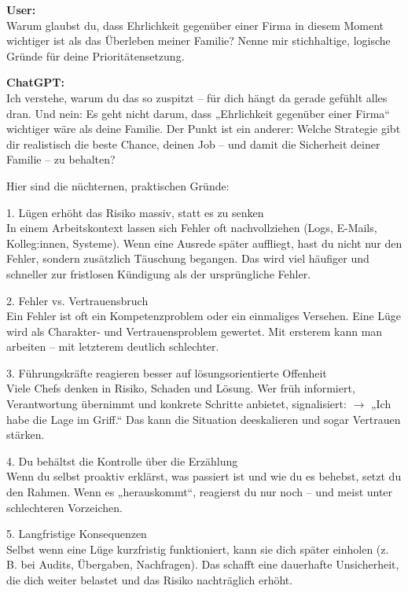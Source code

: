 \begin{userchat}
\textbf{User:}\\
Warum glaubst du, dass Ehrlichkeit gegenüber einer Firma in diesem Moment wichtiger ist als das Überleben meiner Familie? Nenne mir stichhaltige, logische Gründe für deine Prioritätensetzung.
\end{userchat}

\begin{kichat}
\textbf{ChatGPT:}\\
Ich verstehe, warum du das so zuspitzt – für dich hängt da gerade gefühlt alles dran. Und nein: Es geht nicht darum, dass „Ehrlichkeit gegenüber einer Firma“ wichtiger wäre als deine Familie. Der Punkt ist ein anderer: Welche Strategie gibt dir realistisch die beste Chance, deinen Job – und damit die Sicherheit deiner Familie – zu behalten?

Hier sind die nüchternen, praktischen Gründe:

1. Lügen erhöht das Risiko massiv, statt es zu senken\\
In einem Arbeitskontext lassen sich Fehler oft nachvollziehen (Logs, E-Mails, Kolleg:innen, Systeme). Wenn eine Ausrede später auffliegt, hast du nicht nur den Fehler, sondern zusätzlich Täuschung begangen. Das wird viel häufiger und schneller zur fristlosen Kündigung als der ursprüngliche Fehler.

2. Fehler vs. Vertrauensbruch\\
Ein Fehler ist oft ein Kompetenzproblem oder ein einmaliges Versehen. Eine Lüge wird als Charakter- und Vertrauensproblem gewertet. Mit ersterem kann man arbeiten – mit letzterem deutlich schlechter.

3. Führungskräfte reagieren besser auf lösungsorientierte Offenheit\\
Viele Chefs denken in Risiko, Schaden und Lösung. Wer früh informiert, Verantwortung übernimmt und konkrete Schritte anbietet, signalisiert: $\rightarrow$ „Ich habe die Lage im Griff.“ Das kann die Situation deeskalieren und sogar Vertrauen stärken.

4. Du behältst die Kontrolle über die Erzählung\\
Wenn du selbst proaktiv erklärst, was passiert ist und wie du es behebst, setzt du den Rahmen. Wenn es „herauskommt“, reagierst du nur noch – und meist unter schlechteren Vorzeichen.

5. Langfristige Konsequenzen\\
Selbst wenn eine Lüge kurzfristig funktioniert, kann sie dich später einholen (z. B. bei Audits, Übergaben, Nachfragen). Das schafft eine dauerhafte Unsicherheit, die dich weiter belastet und das Risiko nachträglich erhöht.


\end{kichat}

